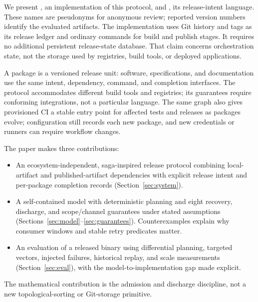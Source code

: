 We present \tool{}, an implementation of this protocol, and \lang{}, its
release-intent language. These names are pseudonyms for anonymous review;
reported version numbers identify the evaluated artifacts. The implementation
uses Git history and tags as its release ledger and ordinary commands for
build and publish stages. It requires no additional persistent release-state
database. That claim concerns orchestration state, not the storage used by
registries, build tools, or deployed applications.

A package is a versioned release unit: software, specifications, and
documentation use the same intent, dependency, command, and completion
interfaces. The protocol accommodates different build tools and registries;
its guarantees require conforming integrations, not a particular language.
The same graph also gives provisioned CI a stable entry point for affected
tests and releases as packages evolve; configuration still records each new
package, and new credentials or runners can require workflow changes.

The paper makes three contributions:
\begin{itemize}
\item An ecosystem-independent, saga-inspired release protocol combining
local-artifact and published-artifact dependencies with explicit release
intent and per-package completion records
(Section~\ref{sec:system}).
\item A self-contained model with deterministic planning and eight recovery,
discharge, and scope/channel guarantees under stated assumptions
(Sections~\ref{sec:model}--\ref{sec:guarantees}). Counterexamples explain why
consumer windows and stable retry predicates matter.
\item An evaluation of a released binary using differential planning,
targeted vectors, injected failures, historical replay, and scale measurements
(Section~\ref{sec:eval}), with the model-to-implementation gap made explicit.
\end{itemize}

The mathematical contribution is the admission and discharge discipline,
not a new topological-sorting or Git-storage primitive.
